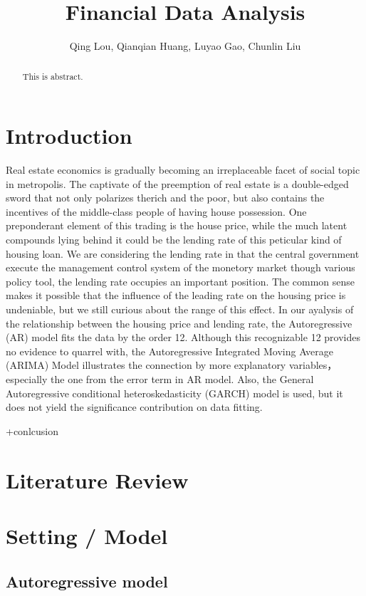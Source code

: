 \documentclass[12pt,letterpaper]{article}
\begin{document}
\title{\textbf{\Large Financial Data Analysis}}
\author{Qing Lou, Qianqian Huang, Luyao Gao, Chunlin Liu}
\date{}
\maketiitle 

\thispagestyle{empty}
\tableofcontents
\newpage
\clearpage

\begin{abstract}
This is abstract.
\end{abstract}


\section{Introduction}

Real estate economics is gradually becoming an irreplaceable facet of social topic in metropolis. 
The captivate of the preemption of real estate is a double-edged sword that not only polarizes therich and the poor, but also contains the incentives of the middle-class people of having house possession.
One preponderant element of this trading is the house price, while the much latent compounds lying behind it could be the lending rate of this peticular kind of housing loan.
We are considering the lending rate in that the central government execute the management control system of the monetory market though various policy tool, the lending rate occupies an important position.
The common sense makes it possible that the influence of the leading rate on the housing price is undeniable, but we still curious about the range of this effect.
In our ayalysis of the relationship between the housing price and lending rate, the Autoregressive (AR) model fits the data by the order 12. 
Although this recognizable 12 provides no evidence to quarrel with, the Autoregressive Integrated Moving Average (ARIMA) Model illustrates the connection by more explanatory variables，especially the one from the error term in AR model.
Also, the General Autoregressive conditional heteroskedasticity (GARCH) model is used, but it does not yield the significance contribution on data fitting.

+conlcusion

\section{Literature Review}

\section{Setting / Model}
\subsection{Autoregressive model}
\end{document}

